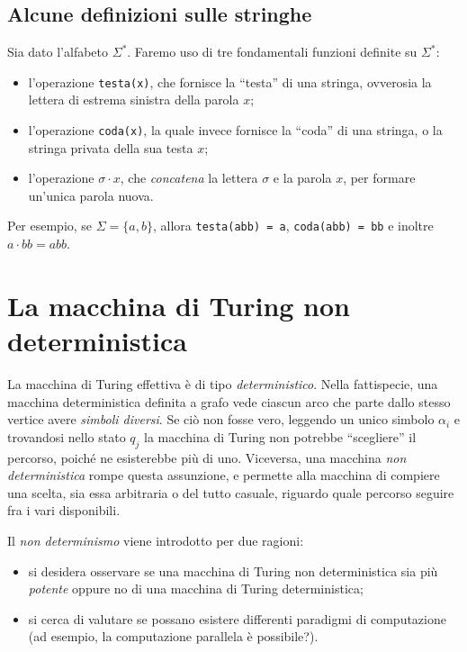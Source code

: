 \documentclass[10pt]{\classname}
\theoremstyle{definition}
\theoremstyle{definition}
\begin{document}
\subsection{Alcune definizioni sulle stringhe}

Sia dato l'alfabeto $\Sigma^*$. Faremo uso di tre fondamentali funzioni
definite su $\Sigma^*$:
\begin{itemize}
    \item l'operazione \texttt{testa(x)}, che fornisce la ``testa'' di una stringa,
        ovverosia la lettera di estrema sinistra della parola $x$;
    \item l'operazione \texttt{coda(x)}, la quale invece fornisce la ``coda'' di una
        stringa, o la stringa privata della sua testa $x$;
    \item l'operazione $\sigma \cdot x$, che \emph{concatena} la lettera
        $\sigma$ e la parola $x$, per formare un'unica parola nuova.
\end{itemize}

Per esempio, se $\Sigma = \{a, b\}$, allora \texttt{testa(abb) = a}, \texttt{coda(abb) = bb} e inoltre $a \cdot bb = abb$.


\section{La macchina di Turing non deterministica}

La macchina di Turing effettiva è di tipo \emph{deterministico}. Nella
fattispecie, una macchina deterministica definita a grafo vede ciascun arco che
parte dallo stesso vertice avere \emph{simboli diversi}. Se ciò non fosse vero,
leggendo un unico simbolo $\alpha_i$ e trovandosi nello stato $q_j$ la macchina
di Turing non potrebbe ``scegliere'' il percorso, poiché ne esisterebbe più di
uno. Viceversa, una macchina \emph{non deterministica} rompe questa assunzione,
e permette alla macchina di compiere una scelta, sia essa arbitraria o del
tutto casuale, riguardo quale percorso seguire fra i vari disponibili. 

Il \emph{non determinismo} viene introdotto per due ragioni:
\begin{itemize}
    \item si desidera osservare se una macchina di Turing non deterministica
        sia più \emph{potente} oppure no di una macchina di Turing deterministica;
    \item si cerca di valutare se possano esistere differenti paradigmi di
        computazione (ad esempio, la computazione parallela è possibile?).
\end{itemize}
\end{document}
